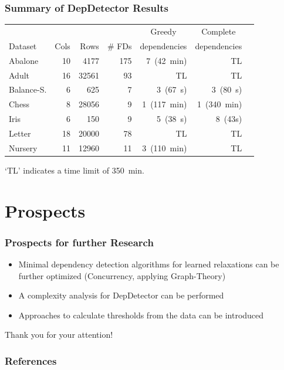 \documentclass{beamer}
\begin{document}
\begin{frame}
    \frametitle{Summary of DepDetector Results}
    \begin{table}[ht]
        \centering
        \begin{tabular}{lrrrrrr}
            \toprule
            \toprule
            & & & & \multicolumn{1}{c}{Greedy} & \multicolumn{1}{c}{Complete} \\
            Dataset & Cols & Rows & \# FDs & dependencies & dependencies \\
            \midrule
            Abalone & 10 & 4177 & 175 & 7~(42~min) & TL \\
            Adult & 16 & 32561 & 93 & TL & TL \\
            Balance-S. & 6 & 625 & 7 & 3~(67~s) & 3~(80~s) \\
            Chess & 8 & 28056 & 9 & 1~(117~min) & 1~(340~min) \\
            Iris & 6 & 150 & 9 & 5~(38~s) & 8~(43s) \\
            Letter & 18 & 20000 & 78 & TL & TL \\
            Nursery & 11 & 12960 & 11 & 3~(110~min) & TL \\
            \bottomrule
            \bottomrule
        \end{tabular}
    \end{table}
`TL' indicates a time limit of 350~min.
\end{frame}

\section{Prospects}
\begin{frame}
    \frametitle{Prospects for further Research}
    \begin{itemize}
        \item Minimal dependency detection algorithms for learned relaxations can be further optimized (Concurrency, applying Graph-Theory)
        \item A complexity analysis for DepDetector can be performed
        \item Approaches to calculate thresholds from the data can be introduced
    \end{itemize}
\end{frame}

\begin{frame}
    \begin{block}{}
        Thank you for your attention!
    \end{block}
\end{frame}
\begin{frame}[allowframebreaks]
\frametitle{References}
\printbibliography
\end{frame}
\end{document}
